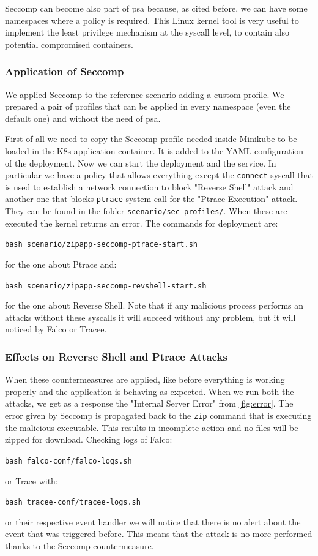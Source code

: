 Seccomp can become also part of \ac{psa} because, as cited before, we can have some namespaces where a policy is required. This Linux kernel tool is very useful to implement the least privilege mechanism at the syscall level, to contain also potential compromised containers.


\subsubsection{Application of Seccomp}
We applied Seccomp to the reference scenario adding a custom profile. We prepared a pair of profiles that can be applied in every namespace (even the default one) and without the need of \ac{psa}.

First of all we need to copy the Seccomp profile needed inside Minikube to be loaded in the K8s application container. It is added to the YAML configuration of the deployment. Now we can start the deployment and the service. In particular we have a policy that allows everything except the \texttt{connect} syscall that is used to establish a network connection to block "Reverse Shell" attack and another one that blocks \texttt{ptrace} system call for the "Ptrace Execution" attack. They can be found in the folder \texttt{scenario/sec-profiles/}. When these are executed the kernel returns an error. The commands for deployment are:

\texttt{bash scenario/zipapp-seccomp-ptrace-start.sh}

\noindent for the one about Ptrace and:

\texttt{bash scenario/zipapp-seccomp-revshell-start.sh}

\noindent for the one about Reverse Shell. Note that if any malicious process performs an attacks without these syscalls it will succeed without any problem, but it will noticed by Falco or Tracee.


\subsubsection{Effects on Reverse Shell and Ptrace Attacks}
When these countermeasures are applied, like before everything is working properly and the application is behaving as expected. When we run both the attacks, we get as a response the "Internal Server Error" from \autoref{fig:error}. The error given by Seccomp is propagated back to the \texttt{zip} command that is executing the malicious executable. This results in incomplete action and no files will be zipped for download. Checking logs of Falco:

\texttt{bash falco-conf/falco-logs.sh}

\noindent or Trace with:

\texttt{bash tracee-conf/tracee-logs.sh}

\noindent or their respective event handler we will notice that there is no alert about the event that was triggered before. This means that the attack is no more performed thanks to the Seccomp countermeasure.

